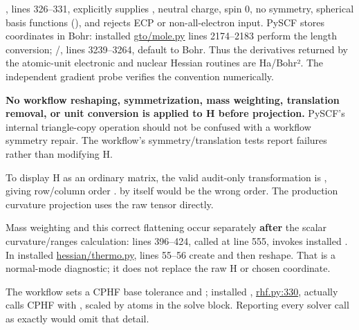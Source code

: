 \documentclass[10pt,a4paper]{article}
\begin{document}
, lines 326–331, explicitly supplies , neutral charge, spin 0, no symmetry, spherical basis functions (), and rejects ECP or non-all-electron input. PySCF stores coordinates in Bohr: installed \href{/Users/novaz/Desktop/qml2.0/.venv-rhf/lib/python3.13/site-packages/pyscf/gto/mole.py:2174}{gto/mole.py} lines 2174–2183 perform the length conversion; /, lines 3239–3264, default to Bohr. Thus the derivatives returned by the atomic-unit electronic and nuclear Hessian routines are Ha/Bohr². The independent gradient probe verifies the convention numerically.

\textbf{No workflow reshaping, symmetrization, mass weighting, translation removal, or unit conversion is applied to H before projection.} PySCF's internal triangle-copy operation should not be confused with a workflow symmetry repair. The workflow's symmetry/translation tests report failures rather than modifying H.

To display H as an ordinary matrix, the valid audit-only transformation is , giving row/column order .  by itself would be the wrong order. The production curvature projection uses the raw tensor directly.

Mass weighting and this correct flattening occur separately \textbf{after} the scalar curvature/ranges calculation:  lines 396–424, called at line 555, invokes installed . In installed \href{/Users/novaz/Desktop/qml2.0/.venv-rhf/lib/python3.13/site-packages/pyscf/hessian/thermo.py:55}{hessian/thermo.py}, lines 55–56 create  and then reshape. That is a normal-mode diagnostic; it does not replace the raw H or chosen coordinate.

The workflow sets a CPHF base tolerance  and ; installed , \href{/Users/novaz/Desktop/qml2.0/.venv-rhf/lib/python3.13/site-packages/pyscf/hessian/rhf.py:330}{rhf.py:330}, actually calls CPHF with , scaled by atoms in the solve block. Reporting every solver call as exactly  would omit that detail.
\end{document}
